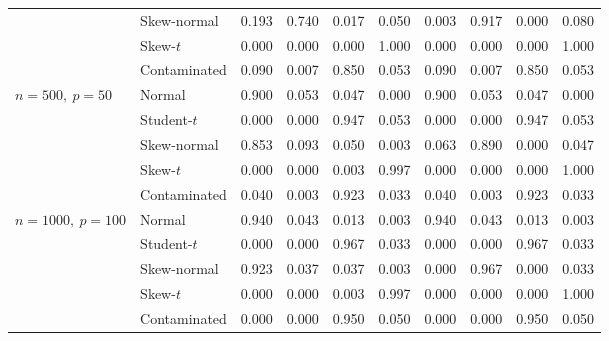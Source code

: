 \documentclass[11pt]{article}
\theoremstyle{plain}
\theoremstyle{definition}
\theoremstyle{remark}
\begin{document}
\begin{table}[!ht]
\begin{tabular}{llcccc@{\hspace{2em}}cccc}
& Skew-normal         & 0.193 & 0.740 & 0.017 & 0.050 & 0.003 & 0.917 & 0.000 & 0.080 \\
& Skew-$t$            & 0.000 & 0.000 & 0.000 & 1.000 & 0.000 & 0.000 & 0.000 & 1.000 \\
& Contaminated & 0.090 & 0.007 & 0.850 & 0.053 & 0.090 & 0.007 & 0.850 & 0.053 \\
\midrule
$n=500,\ p=50$ & Normal              & 0.900 & 0.053 & 0.047 & 0.000 & 0.900 & 0.053 & 0.047 & 0.000 \\
& Student-$t$         & 0.000 & 0.000 & 0.947 & 0.053 & 0.000 & 0.000 & 0.947 & 0.053 \\
& Skew-normal         & 0.853 & 0.093 & 0.050 & 0.003 & 0.063 & 0.890 & 0.000 & 0.047 \\
& Skew-$t$            & 0.000 & 0.000 & 0.003 & 0.997 & 0.000 & 0.000 & 0.000 & 1.000 \\
& Contaminated & 0.040 & 0.003 & 0.923 & 0.033 & 0.040 & 0.003 & 0.923 & 0.033 \\
\midrule
$n=1000,\ p=100$ & Normal              & 0.940 & 0.043 & 0.013 & 0.003 & 0.940 & 0.043 & 0.013 & 0.003 \\
& Student-$t$         & 0.000 & 0.000 & 0.967 & 0.033 & 0.000 & 0.000 & 0.967 & 0.033 \\
& Skew-normal         & 0.923 & 0.037 & 0.037 & 0.003 & 0.000 & 0.967 & 0.000 & 0.033 \\
& Skew-$t$            & 0.000 & 0.000 & 0.003 & 0.997 & 0.000 & 0.000 & 0.000 & 1.000 \\
& Contaminated & 0.000 & 0.000 & 0.950 & 0.050 & 0.000 & 0.000 & 0.950 & 0.050 \\
\bottomrule
\end{tabular}
\end{table}
\end{document}
